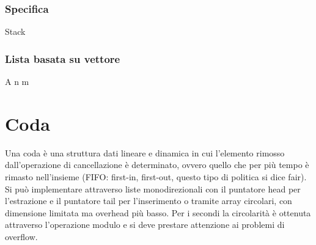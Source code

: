 \subsubsection{Specifica}
\begin{algorithm}\caption{Stack}
\DontPrintSemicolon
{}

\Boolean \IsEmpty{}\;
\;
\Item \Pop{}\;
\Item \Top{}\;
\end{algorithm}
\subsubsection{Lista basata su vettore}
\begin{algorithm}
\DontPrintSemicolon
{}

\caption{\protect\Stack}

\begin{multicols}{2}
\Item[] A   
\Int n		
\Int m		

\Stack\Space{}
\Item\Space{}
\Boolean \Space{}
\Item\Space{}
\end{multicols}
\end{algorithm}
\section{Coda}
Una coda \`e una struttura dati lineare e dinamica in cui l'elemento rimosso dall'operazione di cancellazione \`e determinato, ovvero quello che per pi\`u 
tempo \`e rimasto nell'insieme (FIFO: first-in, first-out, questo tipo di politica si dice fair). Si pu\`o implementare attraverso liste monodirezionali 
con il puntatore head per l'estrazione e il puntatore tail per l'inserimento o tramite array circolari, con dimensione limitata ma overhead pi\`u basso.
Per i secondi la circolarit\`a \`e ottenuta attraverso l'operazione modulo e si deve prestare attenzione ai problemi di overflow.
